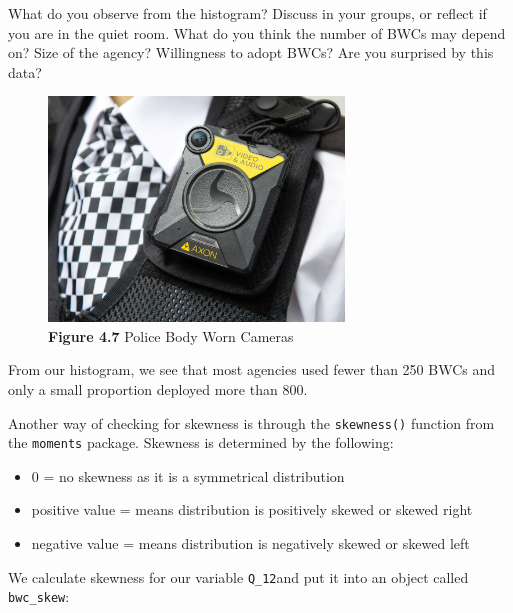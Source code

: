 \documentclass[
]{book}
\newenvironment{Shaded}{\begin{snugshade}}{\end{snugshade}}
\newcommand{\AttributeTok}[1]{\textcolor[rgb]{0.77,0.63,0.00}{#1}}
\newcommand{\ConstantTok}[1]{\textcolor[rgb]{0.00,0.00,0.00}{#1}}
\newcommand{\FunctionTok}[1]{\textcolor[rgb]{0.00,0.00,0.00}{#1}}
\newcommand{\NormalTok}[1]{#1}
\newcommand{\OtherTok}[1]{\textcolor[rgb]{0.56,0.35,0.01}{#1}}
\newcommand{\SpecialCharTok}[1]{\textcolor[rgb]{0.00,0.00,0.00}{#1}}
\providecommand{\tightlist}{%
  \setlength{\itemsep}{0pt}\setlength{\parskip}{0pt}}
\begin{document}
What do you observe from the histogram? Discuss in your groups, or reflect if you are in the quiet room. What do you think the number of BWCs may depend on? Size of the agency? Willingness to adopt BWCs? Are you surprised by this data?

\begin{figure}
\centering
\includegraphics[width=0.7\textwidth,height=\textheight]{Images/bwcs.jpg}
\caption{\textbf{Figure 4.7} Police Body Worn Cameras}
\end{figure}

From our histogram, we see that most agencies used fewer than 250 BWCs and only a small proportion deployed more than 800.

Another way of checking for skewness is through the \texttt{skewness()} function from the \texttt{moments} package. Skewness is determined by the following:

\begin{itemize}
\tightlist
\item
  0 = no skewness as it is a symmetrical distribution
\item
  positive value = means distribution is positively skewed or skewed right
\item
  negative value = means distribution is negatively skewed or skewed left
\end{itemize}

We calculate skewness for our variable \texttt{Q\_12}and put it into an object called \texttt{bwc\_skew}:

\begin{Shaded}
\end{Shaded}
\end{document}
